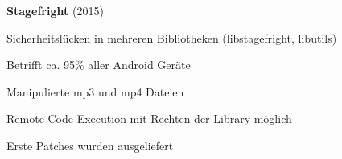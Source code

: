 \begin{frame}
	\centering\textbf{Stagefright} (2015)
	\begin{block}{}
		Sicherheitslücken in mehreren Bibliotheken (libstagefright, libutils)
	\end{block}		
	\begin{block}{}
		Betrifft ca. 95\% aller Android Geräte
	\end{block}
	\begin{block}{}
		Manipulierte mp3 und mp4 Dateien
	\end{block}
	\begin{block}{}
		Remote Code Execution mit Rechten der Library möglich						
	\end{block}
	\begin{block}{}
		Erste Patches wurden ausgeliefert
	\end{block}
\end{frame}
